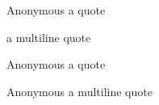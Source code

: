 \begin{Foo}{Anonymous}
a quote

a
multiline
quote
\end{Foo}

\horizontalLine

\begin{Foo}{Anonymous}
a quote
\end{Foo}

\horizontalLine

\begin{Foo}{Anonymous}
a
multiline
quote
\end{Foo}
